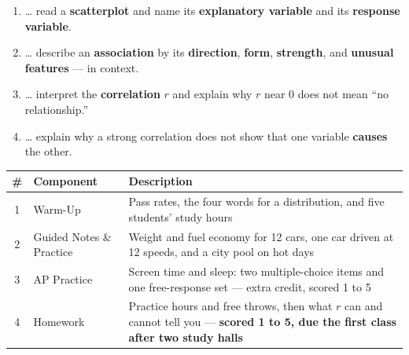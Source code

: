 \documentclass[12pt]{article}
\begin{document}

\namedateperiod
\vspace{0.18in}

\boxguard[14]
\begin{learningtargetbox}
\small
\begin{enumerate}[leftmargin=1.5em, itemsep=5pt]
  \item \ldots{} read a \textbf{scatterplot} and name its \textbf{explanatory variable} and its
        \textbf{response variable}.
  \item \ldots{} describe an \textbf{association} by its \textbf{direction}, \textbf{form},
        \textbf{strength}, and \textbf{unusual features} --- in context.
  \item \ldots{} interpret the \textbf{correlation} $r$ and explain why $r$ near 0 does not mean
        ``no relationship.''
  \item \ldots{} explain why a strong correlation does not show that one variable
        \textbf{causes} the other.
\end{enumerate}
\end{learningtargetbox}

\vspace{0.14in}

\boxguard[14]
\begin{tocbox}
\small
\renewcommand{\arraystretch}{1.5}
\begin{tabularx}{\linewidth}{@{} c l X @{}}
\rowcolor{sky}
\textbf{\#} & \textbf{Component} & \textbf{Description} \\
\midrule
1 & Warm-Up & Pass rates, the four words for a distribution, and five students' study
                 hours \\
2 & Guided Notes \& Practice & Weight and fuel economy for 12 cars, one car driven at 12
                 speeds, and a city pool on hot days \\
3 & AP Practice & Screen time and sleep: two multiple-choice items and one free-response set
                 --- extra credit, scored 1 to 5 \\
4 & Homework & Practice hours and free throws, then what $r$ can and cannot tell you ---
                 \textbf{scored 1 to 5, due the first class after two study halls} \\
\end{tabularx}
\end{tocbox}
\end{document}

